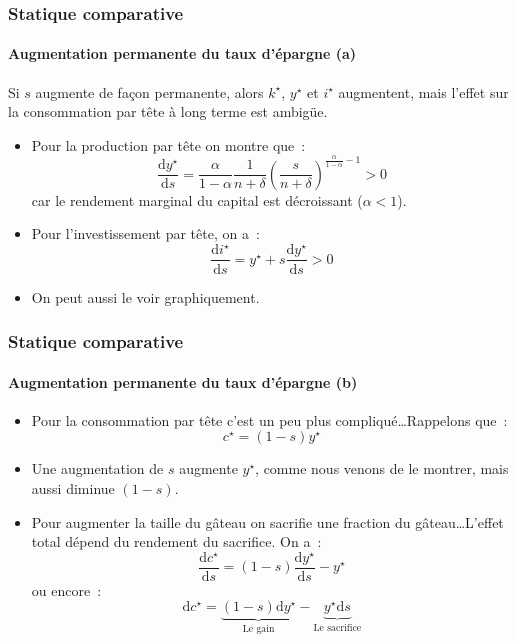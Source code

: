 \documentclass[10pt,notheorems]{beamer}
\theoremstyle{plain}
\theoremstyle{definition} %
\begin{document}
\begin{frame}
  \frametitle{Statique comparative}
  \framesubtitle{Augmentation permanente du taux d'épargne (a)}

  \bigskip

  \begin{block}{}
    Si $s$ augmente de façon permanente, alors $k^{\star}$, $y^{\star}$ et $i^{\star}$ augmentent, mais l'effet sur la consommation par tête à long terme est ambigüe.
  \end{block}

  \bigskip

  \begin{itemize}

  \item Pour la production par tête on montre que~:
    \[
      \frac{\mathrm d y^{\star}}{\mathrm d s} = \frac{\alpha}{1-\alpha}\frac{1}{n+\delta}\left(\frac{s}{n+\delta}\right)^{\frac{\alpha}{1-\alpha}-1}>0
    \]
    car le rendement marginal du capital est décroissant ($\alpha<1$).\newline

  \item Pour l'investissement par tête, on a~:
    \[
      \frac{\mathrm d i^{\star}}{\mathrm d s} = y^{\star} + s\frac{\mathrm d y^{\star}}{\mathrm d s}>0
    \]

  \item On peut aussi le voir graphiquement.
  \end{itemize}

\end{frame}


\begin{frame}
  \frametitle{Statique comparative}
  \framesubtitle{Augmentation permanente du taux d'épargne (b)}

  \bigskip

  \begin{itemize}

  \item Pour la consommation par tête c'est un peu plus compliqué\ldots Rappelons que~:
    \[
      c^{\star} = (1-s) y^{\star}
    \]

    \medskip

  \item Une augmentation de $s$ augmente $y^{\star}$, comme nous venons de le montrer, mais aussi diminue $(1-s)$.\newline

  \item Pour augmenter la taille du gâteau on sacrifie une fraction du gâteau\ldots L'effet total dépend du rendement du sacrifice. On a~:
    \[
      \frac{\mathrm d c^{\star}}{\mathrm d s} = (1-s)\frac{\mathrm d y^{\star}}{\mathrm d s} - y^{\star}
    \]
    ou encore~:
    \[
      \mathrm d c^{\star} = \underbrace{(1-s)\mathrm d y^{\star}}_{\text{Le gain}} - \underbrace{y^{\star}\mathrm d s}_{\text{Le sacrifice}}
    \]

  \end{itemize}

\end{frame}
\end{document}
